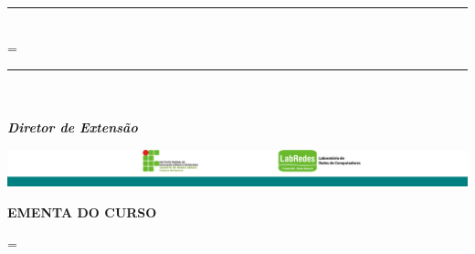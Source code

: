 \documentclass{article}
\begin{document}
{\begin{minipage}{\textwidth}
			\begin{multicols}{2}
				\centering
				\large {\rule{10.0cm}{0.5pt}\\
				=\hbox{\tema}\ifdim\wd0=0pt
					{\insertRESPONSAVEL}\\
					\large \textit{\textbf{Cordenador}}\\
				\else
					{\insertINSTRUTOR}\\
					\large \textit{\textbf{Instrutor}}\\
				\fi}
				
				\large {\rule{10.0cm}{0.5pt}\\
				{\insertESCOLA}\\
				\large	\textit{\textbf{Diretor de Extensão}}\\} 
			\end{multicols}
		
			\singlespacing 
			\singlespacing
		
			\includegraphics[width=\textwidth]{imagens/footer.png}
			
		\end{minipage}
		
		\begin{minipage}{\textwidth}
			
			{\Large \textbf{EMENTA DO CURSO}\\}
			
			\setlength{\columnsep}{0.8cm}
			\begin{minipage}{0.95\textwidth}
			\begin{multicols}{3}	
				\begin{flushleft}
					{\small }
					\small
				\end{flushleft}
			\end{multicols}
			\end{minipage}

			\vspace{0.4cm} 
			
			
			=\hbox{\tema}\ifdim\wd0=0pt
			\else
			\begin{center}
				
				\begin{minipage}{1\textwidth}
					{\large \textbf{Tema do trabalho prático final:} \tema.}
				\end{minipage}
				
			\end{center}
			
			
			\begin{center}
				\begin{minipage}{1\textwidth}
					{\large \textbf{Repositório:} \repositorio}
				\end{minipage}
			\end{center}
			
			\fi
		\end{minipage}			
	}
\end{document}
